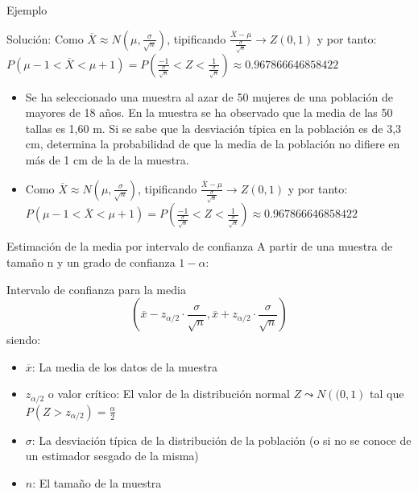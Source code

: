 \documentclass[11pt,handout]{beamer}
\begin{document}
\begin{frame}{Ejemplo}


Solución: Como $\overline{X} \approx N\left(\mu,\frac{\sigma}{\sqrt{n}}\right)$, tipificando $\frac{\overline{X} -\mu}{\frac{\sigma}{\sqrt{n}}} \rightarrow Z(0,1)$ y por tanto: $P(\mu-1 < \overline{X} < \mu +1)=P(\frac{-1}{\frac{\sigma}{\sqrt{n}}} < Z < \frac{1}{\frac{\sigma}{\sqrt{n}}})\approx 0.967866646858422$

\begin{itemize}[<+->]
    \item  Se ha seleccionado una muestra al azar de 50 mujeres de una población de mayores
de 18 años. En la muestra se ha observado que la media de las 50 tallas es 1,60 m. Si se sabe que
la desviación típica en la población es de 3,3 cm, determina la probabilidad de que la
media de la población no difiere en más de 1 cm de la de la muestra. 
    \item Como $\overline{X} \approx N\left(\mu,\frac{\sigma}{\sqrt{n}}\right)$, tipificando $\frac{\overline{X} -\mu}{\frac{\sigma}{\sqrt{n}}} \rightarrow Z(0,1)$ y por tanto: $P(\mu-1 < \overline{X} < \mu +1)=P(\frac{-1}{\frac{\sigma}{\sqrt{n}}} < Z < \frac{1}{\frac{\sigma}{\sqrt{n}}})\approx 0.967866646858422$
    
\end{itemize}

\end{frame}


\begin{frame}
{Estimación de la media por intervalo de confianza}
A partir de una muestra de tamaño n y un grado de confianza $1-\alpha$: 
\begin{block}{Intervalo de confianza para la media}
$$ \left( \overline{x} - z_{\alpha / 2}\cdot \frac{\sigma}{\sqrt{n}} ,  \overline{x} + z_{\alpha / 2}\cdot \frac{\sigma}{\sqrt{n}}
\right)$$
siendo: \begin{itemize}
\item $\overline{x}$: La media de los datos de la muestra
\item $z_{\alpha / 2}$ o valor crítico: El valor de la distribución normal  $Z\leadsto N\left((0,1\right)$ tal que $P(Z>z_{\alpha / 2})=\frac{\alpha}{2}$ 
\item $\sigma$: La desviación típica de la distribución de la población (o si no se conoce de un estimador sesgado de la misma)
\item $n$: El tamaño de la muestra
\end{itemize}
\end{block}
\pause

\end{frame}
\end{document}
